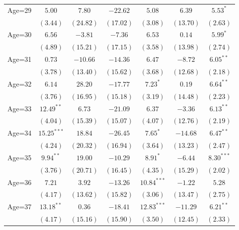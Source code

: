 \documentclass[fullpage]{paper}
\begin{document}
\begin{center}
\begin{longtable}{l c c c c c c }
Age=29      & $5.00$        & $7.80$        & $-22.62$      & $5.08$        & $6.39$        & $5.53^{*}$    \\
            & $(3.44)$      & $(24.82)$     & $(17.02)$     & $(3.08)$      & $(13.70)$     & $(2.63)$      \\
Age=30      & $6.56$        & $-3.81$       & $-7.36$       & $6.53$        & $0.14$        & $5.99^{*}$    \\
            & $(4.89)$      & $(15.21)$     & $(17.15)$     & $(3.58)$      & $(13.98)$     & $(2.74)$      \\
Age=31      & $0.73$        & $-10.66$      & $-14.36$      & $6.47$        & $-8.72$       & $6.05^{**}$   \\
            & $(3.78)$      & $(13.40)$     & $(15.62)$     & $(3.68)$      & $(12.68)$     & $(2.18)$      \\
Age=32      & $6.14$        & $28.20$       & $-17.77$      & $7.23^{*}$    & $0.19$        & $6.64^{**}$   \\
            & $(3.76)$      & $(16.95)$     & $(15.18)$     & $(3.19)$      & $(14.48)$     & $(2.23)$      \\
Age=33      & $12.49^{**}$  & $6.73$        & $-21.09$      & $6.37$        & $-3.36$       & $6.13^{**}$   \\
            & $(4.04)$      & $(15.39)$     & $(15.07)$     & $(4.07)$      & $(12.76)$     & $(2.19)$      \\
Age=34      & $15.25^{***}$ & $18.84$       & $-26.45$      & $7.65^{*}$    & $-14.68$      & $6.47^{**}$   \\
            & $(4.24)$      & $(20.32)$     & $(16.94)$     & $(3.64)$      & $(13.23)$     & $(2.47)$      \\
Age=35      & $9.94^{**}$   & $19.00$       & $-10.29$      & $8.91^{*}$    & $-6.44$       & $8.30^{***}$  \\
            & $(3.76)$      & $(20.71)$     & $(16.45)$     & $(4.35)$      & $(15.29)$     & $(2.02)$      \\
Age=36      & $7.21$        & $3.92$        & $-13.26$      & $10.84^{***}$ & $-1.22$       & $5.28$        \\
            & $(4.17)$      & $(13.62)$     & $(15.82)$     & $(3.06)$      & $(13.47)$     & $(2.75)$      \\
Age=37      & $13.18^{**}$  & $0.36$        & $-18.41$      & $12.83^{***}$ & $-11.29$      & $6.21^{**}$   \\
            & $(4.17)$      & $(15.16)$     & $(15.90)$     & $(3.50)$      & $(12.45)$     & $(2.33)$      \\

\end{longtable}
\end{center}
\end{document}
